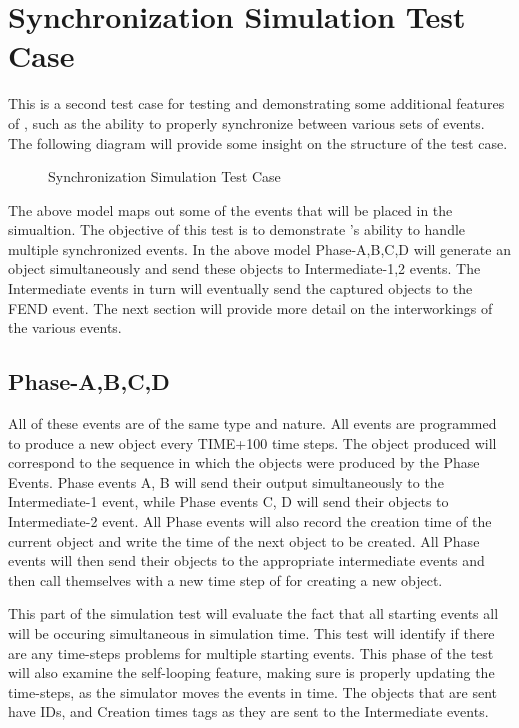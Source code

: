 \section {Synchronization Simulation Test Case}
This is a second test case for testing and demonstrating some
additional features of \dispare, such as the ability to properly 
synchronize between various sets of events.  
The following diagram will
provide some insight on the structure of the test case.
 
\begin{figure}
\label{drawing2}
\centerline{}
\caption { Synchronization Simulation Test Case}
\end{figure}

The above model maps out some of the events that will be placed in
the simualtion.  The objective of this test is to demonstrate
\dispare's ability to handle multiple synchronized events.  In
the above model Phase-A,B,C,D will generate an object
simultaneously and send these objects to Intermediate-1,2 events.  
The Intermediate events in turn will eventually send the 
captured objects to the FEND event. The next section will provide more
detail on the interworkings of the various events.
 
\subsection{Phase-A,B,C,D}
All of these events are of the same type and nature. 
All events are
programmed to produce a new object every TIME+100 time steps.  The
object produced will correspond to the sequence in which the objects
were  produced by the Phase Events.  Phase events A, B will send
their output simultaneously to the Intermediate-1 event, while Phase
events C, D will send their objects to Intermediate-2 event. All
Phase events will also record the creation time of the current object
and write the time of the next object to be created. All Phase events will
then send their objects to the appropriate intermediate events and
then call themselves  with a new time step of for creating a new
object.  
 
This part of the simulation test will evaluate the fact
that all starting events all will be occuring  simultaneous in simulation
time. This test will identify if there are any time-steps problems
for multiple starting events.  This phase of the test will also examine the
self-looping feature, making sure \dispare is properly updating
the time-steps, as the simulator moves the events in time.  The
objects that are sent have IDs, and Creation times tags as they are
sent to the Intermediate events.
 

